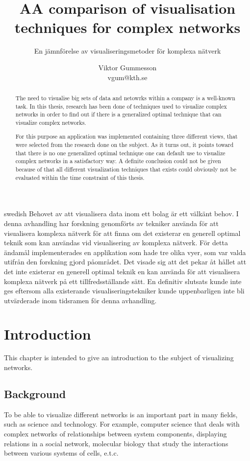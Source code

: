 \documentclass[a4paper,11pt]{kth-mag}
\title{AA comparison of visualisation techniques for complex networks}
\subtitle{En j\"amnf\"orelse av visualiseringsmetoder f\"or komplexa n\"atverk}
\author{Viktor Gummesson\\ \lowercase{vgum@kth.se}}
\begin{document}
\frontmatter
\pagestyle{empty}
\removepagenumbers
\maketitle
{}
\begin{abstract}
The need to visualise big sets of data and netowrks within a company is a well-known task. In this thesis, research has been done of techniques used to visualize complex networks in order to find out if there is a 
generalized optimal technique that can visualize complex networks.

For this purpose an application was implemented containing three different views, that were selected from the research done on the subject. As it turns out, it points toward that there is no one generalized optimal 
technique one can default use to visualize complex networks in a satisfactory way. A definite conclusion could not be given because of that all different visualization techniques that exists could obviously not be 
evaluated within the time constraint of this thesis.
\end{abstract}
\clearpage
\begin{foreignabstract}{swedish}
Behovet av att visualisera data inom ett bolag \"ar ett v\"alk\"ant behov. I
denna avhandling har forskning genomf\"orts av tekniker anv\"anda f\"or att
visualisera komplexa n\"atverk f\"or att finna om det existerar en generell
optimal teknik som kan anv\"andas vid visualisering av komplexa n\"atverk.
F\"or detta \"andam\aa l implementerades en applikation som hade tre
olika vyer, som var valda utifr\aa n den forskning gjord p\aa \space omr\aa det. Det
visade sig att det pekar \aa t h\aa llet att det inte existerar en generell
optimal teknik en kan anv\"anda f\"or att visualisera komplexa n\"atverk p\aa \space
ett tillfredsst\"allande s\"att. En definitiv slutsats kunde inte ges eftersom
alla existerande visualiseringstekniker kunde uppenbarligen inte bli
utv\"arderade inom tidsramen f\"or denna avhandling.
\end{foreignabstract}
\clearpage
\tableofcontents*
\mainmatter
\pagestyle{newchap}
\chapter{Introduction}
This chapter is intended to give an introduction to the subject of visualizing networks.
\section{Background}
To be able to visualize different networks is an important part in many fields, such as science and technology. For example, computer science that deals with complex networks of relationships between system components,
displaying relations in a social network, molecular biology that study the interactions between various systems of cells, e.t.c.
\end{document}
